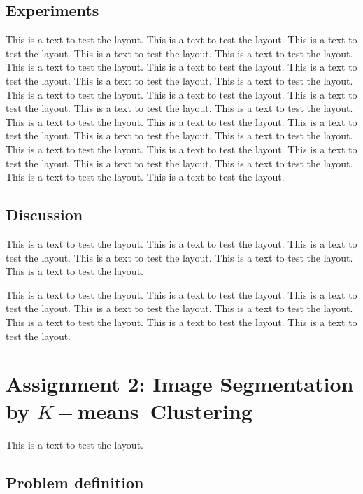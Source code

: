 \documentclass[a4paper,psfig,subfigure,epsfig,fleqn,ausarbeitung,amssmb,float,caption,fontenc]{article}
\begin{document}
\subsection{Experiments}

This is a text to test the layout. This is a text to test the layout.
This is a text to test the layout.  This is a text to test the layout.
This is a text to test the layout. This is a text to test the layout.
This is a text to test the layout. This is a text to test the layout.
This is a text to test the layout.  This is a text to test the layout.
This is a text to test the layout. This is a text to test the layout.
This is a text to test the layout. This is a text to test the layout.
This is a text to test the layout.  This is a text to test the layout.
This is a text to test the layout. This is a text to test the layout.
This is a text to test the layout. This is a text to test the layout.
This is a text to test the layout.  This is a text to test the layout.
This is a text to test the layout. This is a text to test the layout.
This is a text to test the layout. This is a text to test the layout.
This is a text to test the layout.

\subsection{Discussion}

This is a text to test the layout. This is a text to test the layout.
This is a text to test the layout.  This is a text to test the layout.
This is a text to test the layout. This is a text to test the layout.

This is a text to test the layout.  This is a text to test the layout.
This is a text to test the layout. This is a text to test the layout.
This is a text to test the layout. This is a text to test the layout.
This is a text to test the layout.  This is a text to test the layout.


\section{Assignment 2: Image Segmentation by \texorpdfstring{$K-$means}\ \ Clustering}
\label{sec:assignment2}

This is a text to test the layout.

\subsection{Problem definition}
\end{document}
